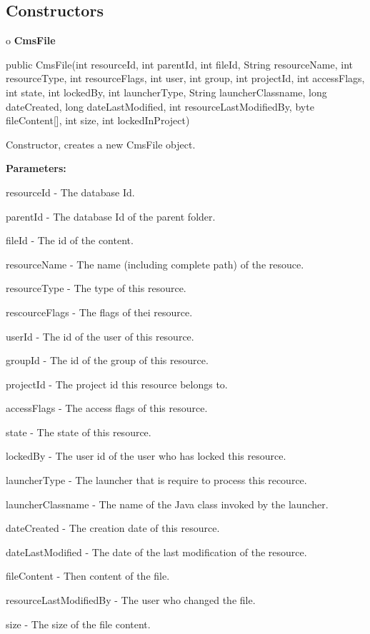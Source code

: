 \subsection*{  Constructors }

o {\bf CmsFile} 

\begin{PRE}
 public CmsFile(int resourceId,
                int parentId,
                int fileId,
                String resourceName,
                int resourceType,
                int resourceFlags,
                int user,
                int group,
                int projectId,
                int accessFlags,
                int state,
                int lockedBy,
                int launcherType,
                String launcherClassname,
                long dateCreated,
                long dateLastModified,
                int resourceLastModifiedBy,
                byte fileContent[],
                int size,
                int lockedInProject)
\end{PRE}

\begin{description}
\htmlDD Constructor, creates a new CmsFile object. 

\begin{description}
\item {\bf Parameters:}  

resourceId - The database Id.  

parentId - The database Id of the parent folder.  

fileId - The id of the content.  

resourceName - The name (including complete path) of the resouce.  

resourceType - The type of this resource.  

rescourceFlags - The flags of thei resource.  

userId - The id of the user of this resource.  

groupId - The id of the group of this resource.  

projectId - The project id this resource belongs to.  

accessFlags - The access flags of this resource.  

state - The state of this resource.  

lockedBy - The user id of the user who has locked this resource.  

launcherType - The launcher that is require to process this recource.  

launcherClassname - The name of the Java class invoked by the launcher.  

dateCreated - The creation date of this resource.  

dateLastModified - The date of the last modification of the resource.  

fileContent - Then content of the file.  

resourceLastModifiedBy - The user who changed the file.  

size - The size of the file content.  
\end{description}

\end{description}

